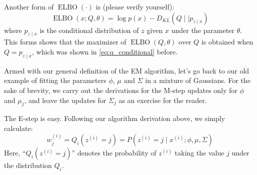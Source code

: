 Another form of $\operatorname{ELBO}(\cdot)$ is (please verify yourself):
\begin{equation}
    \operatorname{ELBO}(x;Q,\theta) = \log p(x) - D_{KL} (Q \mid\mid p_{z \mid x} )
\end{equation}
where $p_{z \mid x}$ is the conditional distribution of $z$ given $x$ under the parameter
$\theta$. This forms shows that the maximizer of $\operatorname{ELBO}(Q,\theta)$ over $Q$ is obtained
when $Q = p_{z \mid x}$, which was shown in \cref{eq:q_conditional} before.

\vspace{1cm}
\label{cha:gmm_revisit}
Armed with our general definition of the EM algorithm, let's go back to our
old example of fitting the parameters $\phi$, $\mu$ and $\Sigma$ in a mixture of Gaussians.
For the sake of brevity, we carry out the derivations for the M-step updates
only for $\phi$ and $\mu_j$, and leave the updates for $\Sigma_j$ as an exercise for the reader.

The E-step is easy. Following our algorithm derivation above, we simply
calculate:
\begin{equation*}
    w^{(i)}_j = Q_i (z^{(i)} = j) = P(z^{(i)} = j\mid x^{(i)} ;\phi,\mu,\Sigma)
\end{equation*}
Here, ``$Q_i (z^{(i)} = j)$'' denotes the probability of $z^{(i)}$ taking the value $j$ under
the distribution $Q_i$.


